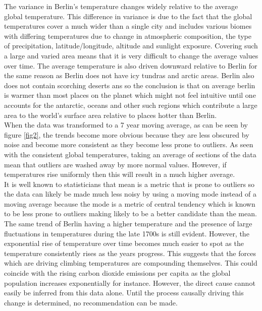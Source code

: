 \documentclass[journal, a4paper]{IEEEtran}
\begin{document}
    The variance in Berlin's temperature changes widely relative to the average global temperature.
This difference in variance is due to the fact that the global temperatures cover a much wider than a single city and includes various biomes with differing temperatures due to change in atmospheric composition, the type of precipitation, latitude/longitude, altitude and sunlight exposure. Covering such a large and varied area means that it is very difficult to change the average values over time. The average temperature is also driven downward relative to Berlin for the same reason as Berlin does not have icy tundras and arctic areas. Berlin also does not contain scorching deserts ans so the conclusion is that on average berlin is warmer than most places on the planet which might not feel intuitive until one accounts for the antarctic, oceans and other such regions which contribute a large area to the world's surface area relative to places hotter than Berlin.\\
    
    When the data was transformed to a 7 year moving average, as can be seen by figure \ref{fig2},  the trends become more obvious because they are less obscured by noise and become more consistent as they become less prone to outliers. As seen with the consistent global temperatures, taking an average of sections of the data mean that outliers are washed away by more normal values. However, if temperatures rise uniformly then this will result in a much higher average.\\
    
    It is well known to statisticians that mean is a metric that is prone to outliers so the data can likely be made much less noisy by using a moving mode instead of a moving average because the mode is a metric of central tendency which is known to be less prone to outliers making likely to be a better candidate than the mean.\\
    
    The same trend of Berlin having a higher temperature and the presence of large fluctuations in temperatures during the late 1700s is still evident. However, the exponential rise of temperature over time becomes much easier to spot as the temperature consistently rises as the years progress. This suggests that the forces which are driving climbing temperatures are compounding themselves. This could coincide with the rising carbon dioxide emissions per capita as the global population increases exponentially for instance. However, the direct cause cannot easily be inferred from this data alone. Until the process causally driving this change is determined, no recommendation can be made.\\
\end{document}

